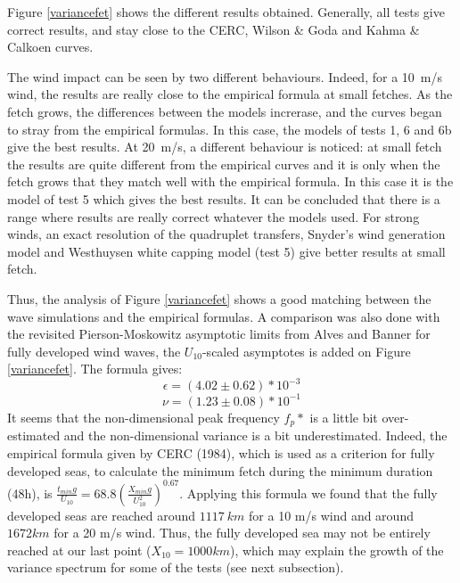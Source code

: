 Figure \ref{variancefet} shows the different results obtained. Generally, all
tests give correct results, and stay close to the CERC, Wilson \& Goda and
Kahma \& Calkoen curves.

The wind impact can be seen by two different behaviours. Indeed, for a 10~m/s
wind, the results are really close to the empirical formula at small fetches.
As the fetch grows, the differences between the models increrase, and the
curves began to stray from the empirical formulas. In this case, the models of
tests 1, 6 and 6b give the best results. At 20~m/s, a different behaviour is
noticed: at small fetch the results are quite different from the empirical
curves and it is only when the fetch grows that they match well with the
empirical formula. In this case it is the model of test 5 which gives the best
results. It can be concluded that there is a range where \tomawac results are
really correct whatever the models used. For strong winds, an exact resolution
of the quadruplet transfers, Snyder's wind generation model and Westhuysen
white capping model (test 5) give better results at small fetch.

Thus, the analysis of Figure \ref{variancefet} shows a good matching between
the \tomawac wave simulations and the empirical formulas. A comparison was also
done with the revisited Pierson-Moskowitz asymptotic limits from Alves and
Banner \cite{Alves2003} for fully developed wind waves, the $U_{10}$-scaled
asymptotes is added on Figure \ref{variancefet}. The formula gives:
\[\epsilon = (4.02 \pm 0.62)*10^{-3}\]
\[\nu = (1.23 \pm 0.08)* 10^{-1}\]
It seems that the non-dimensional peak frequency $f_p*$ is a little bit
over-estimated and the non-dimensional variance is a bit underestimated.
Indeed, the empirical formula given by CERC (1984), which is used as a
criterion for fully developed seas, to calculate the minimum fetch during the
minimum duration (48h), is $\frac{t_{min} g}{U_{10}} = 68.8
(\frac{X_{min} g}{U_{10}^2})^{0.67}$. Applying this formula we found that the
fully developed seas are reached around $1 117~km$ for a 10 m/s wind and
around $1 672 km$ for a 20 m/s wind. Thus, the fully developed sea may not be
entirely reached at our last point ($X_{10} = 1000km$), which may explain the
growth of the variance spectrum for some of the tests (see next subsection).

